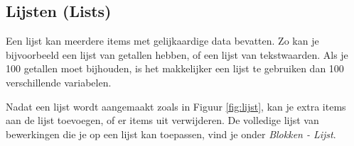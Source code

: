 \subsection{Lijsten (Lists)}
Een lijst kan meerdere items met gelijkaardige data bevatten. Zo kan je bijvoorbeeld een lijst van getallen hebben, of een lijst van tekstwaarden. Als je 100 getallen moet bijhouden, is het makkelijker een lijst te gebruiken dan 100 verschillende variabelen.

Nadat een lijst wordt aangemaakt zoals in Figuur \ref{fig:lijst}, kan je extra items aan de lijst toevoegen, of er items uit verwijderen. De volledige lijst van bewerkingen die je op een lijst kan toepassen, vind je onder \emph{Blokken - Lijst}.



